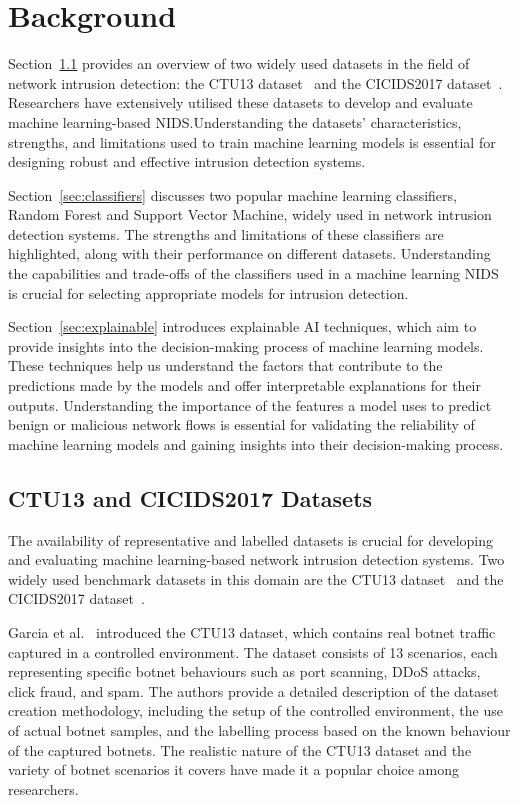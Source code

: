 \chapter{Background}\label{chap:background}

Section~\ref{sec:datasets} provides an overview of two widely used datasets in the field of network intrusion detection: the CTU13 dataset~\cite{garcia2014empirical} and the CICIDS2017 dataset~\cite{sharafaldin2018toward}. Researchers have extensively utilised these datasets to develop and evaluate machine learning-based NIDS.\@ Understanding the datasets' characteristics, strengths, and limitations used to train machine learning models is essential for designing robust and effective intrusion detection systems.

Section~\ref{sec:classifiers} discusses two popular machine learning classifiers, Random Forest and Support Vector Machine, widely used in network intrusion detection systems. The strengths and limitations of these classifiers are highlighted, along with their performance on different datasets. Understanding the capabilities and trade-offs of the classifiers used in a machine learning NIDS is crucial for selecting appropriate models for intrusion detection.

Section~\ref{sec:explainable} introduces explainable AI techniques, which aim to provide insights into the decision-making process of machine learning models. These techniques help us understand the factors that contribute to the predictions made by the models and offer interpretable explanations for their outputs. Understanding the importance of the features a model uses to predict benign or malicious network flows is essential for validating the reliability of machine learning models and gaining insights into their decision-making process.

\section{CTU13 and CICIDS2017 Datasets}\label{sec:datasets}

The availability of representative and labelled datasets is crucial for developing and evaluating machine learning-based network intrusion detection systems. Two widely used benchmark datasets in this domain are the CTU13 dataset~\cite{garcia2014empirical} and the CICIDS2017 dataset~\cite{sharafaldin2018toward}.

Garcia et al.~\cite{garcia2014empirical} introduced the CTU13 dataset, which contains real botnet traffic captured in a controlled environment. The dataset consists of 13 scenarios, each representing specific botnet behaviours such as port scanning, DDoS attacks, click fraud, and spam. The authors provide a detailed description of the dataset creation methodology, including the setup of the controlled environment, the use of actual botnet samples, and the labelling process based on the known behaviour of the captured botnets. The realistic nature of the CTU13 dataset and the variety of botnet scenarios it covers have made it a popular choice among researchers.

